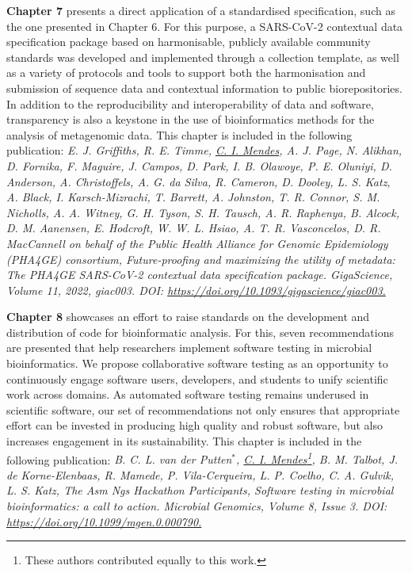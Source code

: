 \textbf{Chapter 7} presents a direct application of a standardised specification, such as the one presented in Chapter 6. For this purpose, a SARS-CoV-2 contextual data specification package based on harmonisable, publicly available community standards was developed and implemented through a collection template, as well as a variety of protocols and tools to support both the harmonisation and submission of sequence data and contextual information to public biorepositories. In addition to the reproducibility and interoperability of data and software, transparency is also a keystone in the use of bioinformatics methods for the analysis of metagenomic data. This chapter is included in the following publication: \textit{E. J. Griffiths, R. E. Timme, \underline{C. I. Mendes}, A. J. Page, N. Alikhan, D. Fornika, F. Maguire, J. Campos, D. Park, I. B. Olawoye, P. E. Oluniyi, D. Anderson, A. Christoffels, A. G. da Silva, R. Cameron, D. Dooley, L. S. Katz, A. Black, I. Karsch-Mizrachi, T. Barrett, A. Johnston, T. R. Connor, S. M. Nicholls, A. A. Witney, G. H. Tyson, S. H. Tausch, A. R. Raphenya, B. Alcock, D. M. Aanensen, E. Hodcroft, W. W. L. Hsiao, A. T. R. Vasconcelos, D. R. MacCannell on behalf of the Public Health Alliance for Genomic Epidemiology (PHA4GE) consortium, Future-proofing and maximizing the utility of metadata: The PHA4GE SARS-CoV-2 contextual data specification package. GigaScience, Volume 11, 2022, giac003. DOI: \url{https://doi.org/10.1093/gigascience/giac003.}} 

\textbf{Chapter 8} showcases an effort to raise standards on the development and distribution of code for bioinformatic analysis. For this, seven recommendations are presented that help researchers implement software testing in microbial bioinformatics. We propose collaborative software testing as an opportunity to continuously engage software users, developers, and students to unify scientific work across domains. As automated software testing remains underused in scientific software, our set of recommendations not only ensures that appropriate effort can be invested in producing high quality and robust software, but also increases engagement in its sustainability. This chapter is included in the following publication: \textit{B. C. L. van der Putten$^*$, \underline{C. I. Mendes}\footnote[1]{These authors contributed equally to this work.}, B. M. Talbot, J. de Korne-Elenbaas, R. Mamede, P. Vila-Cerqueira, L. P. Coelho, C. A. Gulvik, L. S. Katz, The Asm Ngs Hackathon Participants, Software testing in microbial bioinformatics: a call to action. Microbial Genomics, Volume 8, Issue 3. DOI: \url{https://doi.org/10.1099/mgen.0.000790.}}

